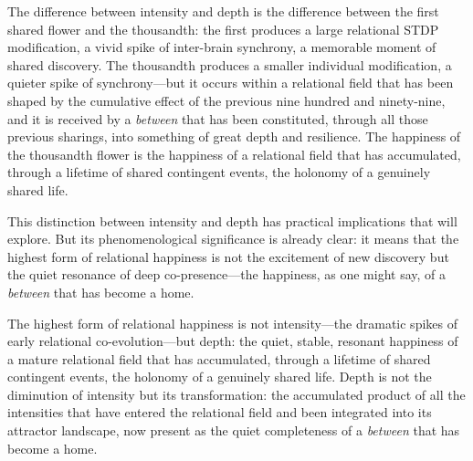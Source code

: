The difference between intensity and depth is the difference between the first shared flower and the thousandth: the first produces a large relational STDP modification, a vivid spike of inter-brain synchrony, a memorable moment of shared discovery. The thousandth produces a smaller individual modification, a quieter spike of synchrony---but it occurs within a relational field that has been shaped by the cumulative effect of the previous nine hundred and ninety-nine, and it is received by a \emph{between} that has been constituted, through all those previous sharings, into something of great depth and resilience. The happiness of the thousandth flower is the happiness of a relational field that has accumulated, through a lifetime of shared contingent events, the holonomy of a genuinely shared life.

This distinction between intensity and depth has practical implications that  will explore. But its phenomenological significance is already clear: it means that the highest form of relational happiness is not the excitement of new discovery but the quiet resonance of deep co-presence---the happiness, as one might say, of a \emph{between} that has become a home.

\begin{claim}
The highest form of relational happiness is not intensity---the dramatic spikes of early relational co-evolution---but depth: the quiet, stable, resonant happiness of a mature relational field that has accumulated, through a lifetime of shared contingent events, the holonomy of a genuinely shared life. Depth is not the diminution of intensity but its transformation: the accumulated product of all the intensities that have entered the relational field and been integrated into its attractor landscape, now present as the quiet completeness of a \emph{between} that has become a home.
\end{claim}

